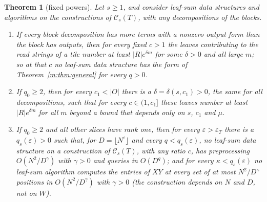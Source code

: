 \documentclass[11pt]{article}
\newtheorem{theorem}{Theorem}[section]
\theoremstyle{definition}
\theoremstyle{remark}
\begin{document}
\begin{theorem}[fixed powers]\label{m:thm:powers}
Let $s\ge1$, and consider leaf-sum data structures and algorithms on the constructions of $\mathcal C_s(T)$, with any decompositions of the blocks.
\begin{enumerate}[label=(\alph*),nosep]
\item If every block decomposition has more terms with a nonzero output form than the block has outputs, then for every fixed $c>1$ the leaves contributing to the read strings of a tile number at least $|R|e^{\delta m}$ for some $\delta>0$ and all large $m$; so at that $c$ no leaf-sum data structure has the form of Theorem~\ref{m:thm:general} for every $q>0$.
\item If $q_0\ge2$, then for every $c_1<|O|$ there is a $\delta=\delta(s,c_1)>0$, the same for all decompositions, such that for every $c\in(1,c_1]$ these leaves number at least $|R|e^{\delta m}$ for all $m$ beyond a bound that depends only on $s$, $c_1$ and $\mu$.
\item If $q_0\ge2$ and all other slices have rank one, then for every $\varepsilon>\varepsilon_T$ there is a $q_s(\varepsilon)>0$ such that, for $D=\lfloor N^\varepsilon\rfloor$ and every $q<q_s(\varepsilon)$, no leaf-sum data structure on a construction of $\mathcal C_s(T)$, with any ratio $c$, has preprocessing $O(N^2/D^\gamma)$ with $\gamma>0$ and queries in $O(D^q)$; and for every $\kappa<q_s(\varepsilon)$ no leaf-sum algorithm computes the entries of $XY$ at every set of at most $N^2/D^\kappa$ positions in $O(N^2/D^\gamma)$ with $\gamma>0$ (the construction depends on $N$ and $D$, not on $W$).
\end{enumerate}
\end{theorem}
\end{document}
